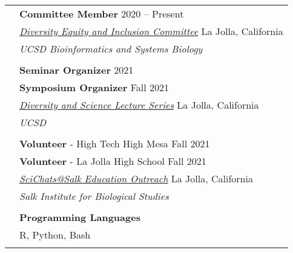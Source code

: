 \documentclass[letterpaper, 11pt]{article}
\begin{document}
\begin{longtable}{p{1.6in}p{4.9in}}
& \textbf{Committee Member} \hfill 2020 -- Present \\
& \href{https://bioinformatics.ucsd.edu/node/19020}{\textit{Diversity Equity and Inclusion Committee}} \hfill La Jolla, California \\
& \textit{UCSD Bioinformatics and Systems Biology} \\
& \\

& \textbf{Seminar Organizer} \hfill 2021 \\
& \textbf{Symposium Organizer} \hfill Fall 2021 \\
& \href{https://www.ucsddasl.com/about}{\textit{Diversity and Science Lecture Series}} \hfill La Jolla, California \\
& \textit{UCSD} \\
& \\

& \textbf{Volunteer} - High Tech High Mesa \hfill Fall 2021 \\
& \textbf{Volunteer} - La Jolla High School \hfill Fall 2021 \\
& \href{https://www.salk.edu/about/education-outreach/volunteer-opportunities/scichatssalk/}{\textit{SciChats@Salk Education Outreach}} \hfill La Jolla, California \\
& \textit{Salk Institute for Biological Studies} \\
& \\


{\color{OliveGreen}{Proficiencies / Skills}}
& \textbf{Programming Languages}\\
& R, Python, Bash \\
& \\






\end{longtable}
\end{document}
